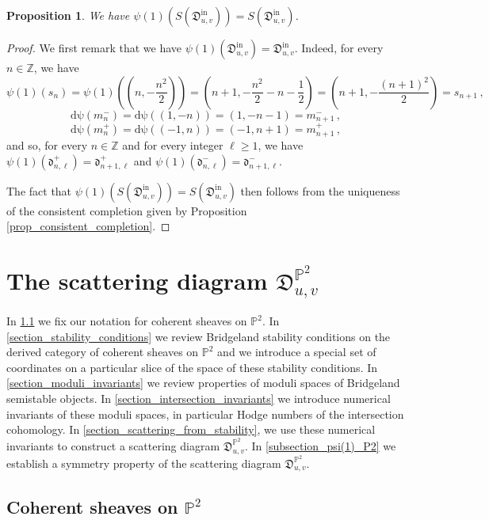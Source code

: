 \documentclass[12pt, a4paper]{amsart}
\newtheorem{prop}[defn]{Proposition}
\newcommand\PP{\mathbb P}
\newcommand\Z{\mathbb Z}
\newcommand\fd{\mathfrak d}
\newcommand\fD{\mathfrak D}
\newcommand\iin{\mathrm{in}}
\begin{document}
\begin{prop}\label{prop_psi(1)}
We have 
$\psi(1)(S(\fD^{\iin}_{u,v}))=S(\fD^{\iin}_{u,v})$.
\end{prop}

\begin{proof}
We first remark that we have 
$\psi(1)(\fD^\iin_{u,v})=\fD^\iin_{u,v}$.
Indeed, for every $n \in \Z$, we have 
\[ \psi(1)(s_n)=\psi(1)((n,-\frac{n^2}{2}))=(n+1,-\frac{n^2}{2}-n-\frac{1}{2})=
(n+1,-\frac{(n+1)^2}{2})= s_{n+1}\,,\] 
\[ \mathrm{d\psi}(m_n^-)=
\mathrm{d\psi}((1,-n))
=(1,-n-1)
=m_{n+1}^-\,,\]
\[ \mathrm{d \psi}(m_n^+)=
\mathrm{d\psi}((-1,n))
=(-1, n+1)
=m_{n+1}^+\,,\]
and so, for every $n \in \Z$ and for every 
integer $\ell \geqslant 1$, we have 
$\psi(1)(\fd_{n,\ell}^+)
=\fd_{n+1,\ell}^+$ and 
$\psi(1)(\fd_{n,\ell}^-)=\fd_{n+1,\ell}^-$.

The fact that $\psi(1)(S(\fD^{\iin}_{u,v}))=S(\fD^{\iin}_{u,v})$ then follows from the uniqueness of the consistent completion given by Proposition 
\ref{prop_consistent_completion}.
\end{proof}

\section{The scattering diagram $\fD^{\PP^2}_{u,v}$}
\label{section_scattering_p2}

In \cref{section_sheaves} we fix our notation for coherent sheaves on
$\PP^2$.
In \cref{section_stability_conditions} we review Bridgeland stability conditions on the derived category of coherent sheaves on $\PP^2$ and we introduce a special set of coordinates
on a particular slice of the space 
of these stability conditions. 
In \cref{section_moduli_invariants} we review 
properties of moduli spaces of Bridgeland  semistable objects.
In \cref{section_intersection_invariants}
we introduce numerical invariants of these moduli spaces, in particular Hodge numbers of the intersection cohomology.
In \cref{section_scattering_from_stability}, we
use these numerical invariants to 
construct a scattering diagram $\fD^{\PP^2}_{u,v}$. 
In \cref{subsection_psi(1)_P2} we establish a symmetry property of the scattering diagram 
$\fD_{u,v}^{\PP^2}$.

\subsection{Coherent sheaves on $\PP^2$}
\label{section_sheaves}
\end{document}
